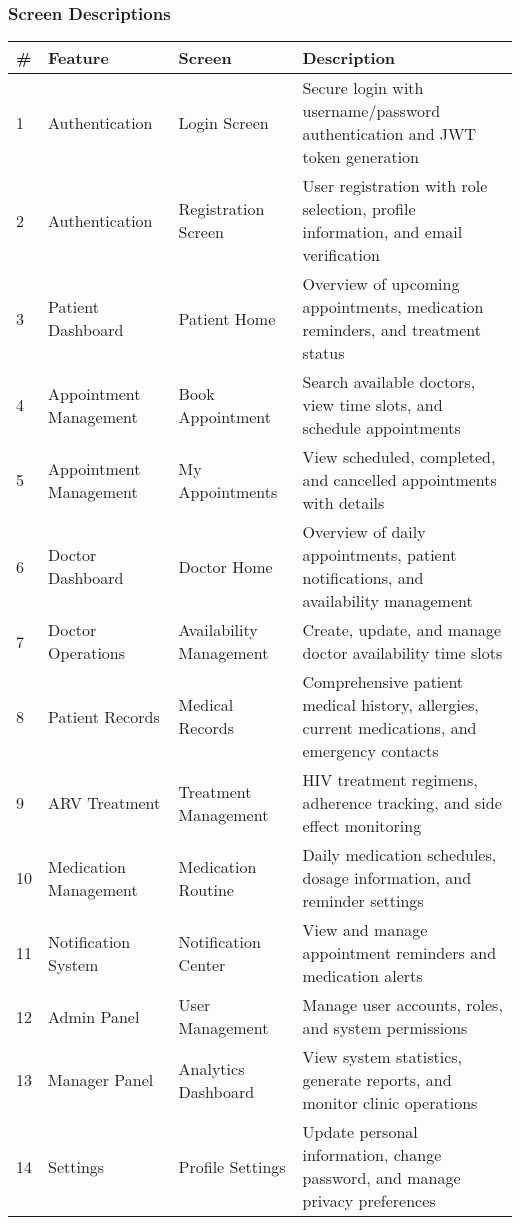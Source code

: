 \documentclass[12pt,a4paper]{article}
\begin{document}
\subsubsection{Screen Descriptions}

\begin{longtable}{|p{1cm}|p{3cm}|p{3cm}|p{7cm}|}
\hline
\textbf{\#} & \textbf{Feature} & \textbf{Screen} & \textbf{Description} \\
\hline
1 & Authentication & Login Screen & Secure login with username/password authentication and JWT token generation \\
\hline
2 & Authentication & Registration Screen & User registration with role selection, profile information, and email verification \\
\hline
3 & Patient Dashboard & Patient Home & Overview of upcoming appointments, medication reminders, and treatment status \\
\hline
4 & Appointment Management & Book Appointment & Search available doctors, view time slots, and schedule appointments \\
\hline
5 & Appointment Management & My Appointments & View scheduled, completed, and cancelled appointments with details \\
\hline
6 & Doctor Dashboard & Doctor Home & Overview of daily appointments, patient notifications, and availability management \\
\hline
7 & Doctor Operations & Availability Management & Create, update, and manage doctor availability time slots \\
\hline
8 & Patient Records & Medical Records & Comprehensive patient medical history, allergies, current medications, and emergency contacts \\
\hline
9 & ARV Treatment & Treatment Management & HIV treatment regimens, adherence tracking, and side effect monitoring \\
\hline
10 & Medication Management & Medication Routine & Daily medication schedules, dosage information, and reminder settings \\
\hline
11 & Notification System & Notification Center & View and manage appointment reminders and medication alerts \\
\hline
12 & Admin Panel & User Management & Manage user accounts, roles, and system permissions \\
\hline
13 & Manager Panel & Analytics Dashboard & View system statistics, generate reports, and monitor clinic operations \\
\hline
14 & Settings & Profile Settings & Update personal information, change password, and manage privacy preferences \\
\hline
\end{longtable}
\end{document}
